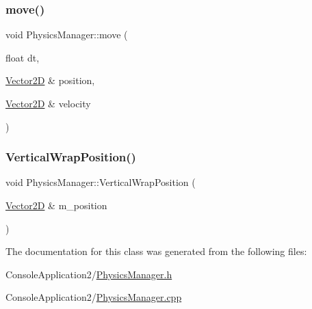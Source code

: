 \hypertarget{class_physics_manager_afcc811e776c173c001762986adcfc731}{}\label{class_physics_manager_afcc811e776c173c001762986adcfc731} 
\subsubsection{\texorpdfstring{move()}{move()}}
{\footnotesize\ttfamily void Physics\+Manager\+::move (\begin{DoxyParamCaption}\item[{float}]{dt,  }\item[{\hyperlink{class_vector2_d}{Vector2D} \&}]{position,  }\item[{\hyperlink{class_vector2_d}{Vector2D} \&}]{velocity }\end{DoxyParamCaption})\hspace{0.3cm}{\ttfamily [static]}}

\hypertarget{class_physics_manager_a754fec8e5f6ef692eb373d209689f897}{}\label{class_physics_manager_a754fec8e5f6ef692eb373d209689f897} 
\subsubsection{\texorpdfstring{Vertical\+Wrap\+Position()}{VerticalWrapPosition()}}
{\footnotesize\ttfamily void Physics\+Manager\+::\+Vertical\+Wrap\+Position (\begin{DoxyParamCaption}\item[{\hyperlink{class_vector2_d}{Vector2D} \&}]{m\+\_\+position }\end{DoxyParamCaption})\hspace{0.3cm}{\ttfamily [static]}}



The documentation for this class was generated from the following files\+:\begin{DoxyCompactItemize}
\item 
Console\+Application2/\hyperlink{_physics_manager_8h}{Physics\+Manager.\+h}\item 
Console\+Application2/\hyperlink{_physics_manager_8cpp}{Physics\+Manager.\+cpp}\end{DoxyCompactItemize}
